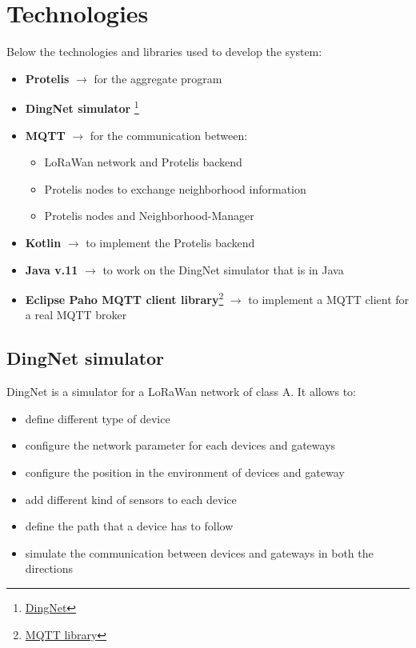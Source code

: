 \chapter{Technologies}

Below the technologies and libraries used to develop the system:

\begin{itemize}
    \item \textbf{Protelis} $\rightarrow$ for the aggregate program
    \item \textbf{DingNet simulator} \footnote{\href{https://github.com/dimoibiehg/DingNet}{DingNet}}
    \item \textbf{MQTT} $\rightarrow$ for the communication between:
    \begin{itemize}
        \item LoRaWan network and Protelis backend
        \item Protelis nodes to exchange neighborhood information
        \item Protelis nodes and Neighborhood-Manager
    \end{itemize}
    \item \textbf{Kotlin} $\rightarrow$ to implement the Protelis backend
    \item \textbf{Java v.11} $\rightarrow$ to work on the DingNet simulator that is in Java
    \item \textbf{Eclipse Paho MQTT client library}\footnote{\href{https://github.com/eclipse/paho.mqtt.java}{MQTT library}} $\rightarrow$ to implement a MQTT client for a real MQTT broker
\end{itemize}

\section{DingNet simulator}
DingNet is a simulator for a LoRaWan network of class A. It allows to:
\begin{itemize}
    \item define different type of device
    \item configure the network parameter for each devices and gateways
    \item configure the position in the environment of devices and gateway
    \item add different kind of sensors to each device 
    \item define the path that a device has to follow
    \item simulate the communication between devices and gateways in both the directions
\end{itemize}

